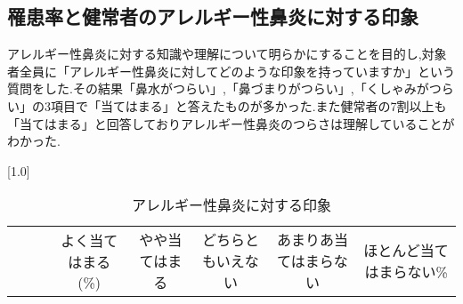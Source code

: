 \documentclass{jsarticle}
\begin{document}
\subsection{罹患率と健常者のアレルギー性鼻炎に対する印象}
アレルギー性鼻炎に対する知識や理解について明らかにすることを目的し,対象者全員に「アレルギー性鼻炎に対してどのような印象を持っていますか」という質問をした.その結果「鼻水がつらい」,「鼻づまりがつらい」,「くしゃみがつらい」の3項目で「当てはまる」と答えたものが多かった.また健常者の7割以上も「当てはまる」と回答しておりアレルギー性鼻炎のつらさは理解していることがわかった.
\begin{table}[h]
\centering
\caption{アレルギー性鼻炎に対する印象}
\scalebox{0.7}[1.0]{
\begin{tabular}{lcccccc}\hline
　& &よく当てはまる(\%)&やや当てはまる&どちらともいえない&あまりあ当てはまらない&ほとんど当てはまらない\% \\


\end{tabular}}
\end{table}
\end{document}
